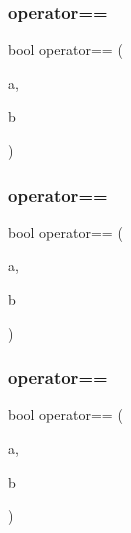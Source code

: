 \mbox{\label{class_f_l___f_p_a7f68a65590040b22d55e29f700a70090}} 
\subsubsection{\texorpdfstring{operator==}{operator==}\hspace{0.1cm}{\footnotesize\ttfamily [1/3]}}
{\footnotesize\ttfamily bool operator== (\begin{DoxyParamCaption}\item[{const \hyperlink{class_f_l___f_p}{F\+L\+\_\+\+FP} \&}]{a,  }\item[{const \hyperlink{class_f_l___f_p}{F\+L\+\_\+\+FP} \&}]{b }\end{DoxyParamCaption})\hspace{0.3cm}{\ttfamily [friend]}}

\mbox{\label{class_f_l___f_p_a666442f1b900ba2e6680d77ec4261a9e}} 
\subsubsection{\texorpdfstring{operator==}{operator==}\hspace{0.1cm}{\footnotesize\ttfamily [2/3]}}
{\footnotesize\ttfamily bool operator== (\begin{DoxyParamCaption}\item[{const \hyperlink{class_f_l___f_p}{F\+L\+\_\+\+FP} \&}]{a,  }\item[{const double \&}]{b }\end{DoxyParamCaption})\hspace{0.3cm}{\ttfamily [friend]}}

\mbox{\label{class_f_l___f_p_a8b8fd18407f83f9bbf63012179eb694d}} 
\subsubsection{\texorpdfstring{operator==}{operator==}\hspace{0.1cm}{\footnotesize\ttfamily [3/3]}}
{\footnotesize\ttfamily bool operator== (\begin{DoxyParamCaption}\item[{const double \&}]{a,  }\item[{const \hyperlink{class_f_l___f_p}{F\+L\+\_\+\+FP} \&}]{b }\end{DoxyParamCaption})\hspace{0.3cm}{\ttfamily [friend]}}

